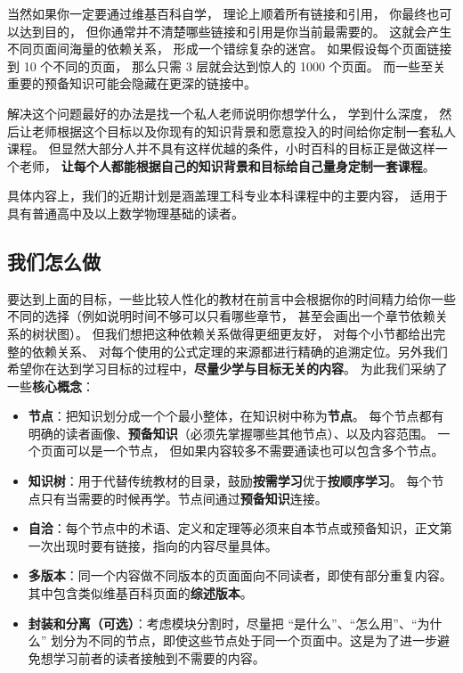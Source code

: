 当然如果你一定要通过维基百科自学， 理论上顺着所有链接和引用， 你最终也可以达到目的， 但你通常并不清楚哪些链接和引用是你当前最需要的。 这就会产生不同页面间海量的依赖关系， 形成一个错综复杂的迷宫。 如果假设每个页面链接到 10 个不同的页面， 那么只需 3 层就会达到惊人的 1000 个页面。 而一些至关重要的预备知识可能会隐藏在更深的链接中。

解决这个问题最好的办法是找一个私人老师说明你想学什么， 学到什么深度， 然后让老师根据这个目标以及你现有的知识背景和愿意投入的时间给你定制一套私人课程。 但显然大部分人并不具有这样优越的条件，小时百科的目标正是做这样一个老师， \textbf{让每个人都能根据自己的知识背景和目标给自己量身定制一套课程}。

具体内容上，我们的近期计划是涵盖理工科专业本科课程中的主要内容， 适用于具有普通高中及以上数学物理基础的读者。

\subsection{我们怎么做}
要达到上面的目标，一些比较人性化的教材在前言中会根据你的时间精力给你一些不同的选择（例如说明时间不够可以只看哪些章节， 甚至会画出一个章节依赖关系的树状图）。 但我们想把这种依赖关系做得更细更友好， 对每个小节都给出完整的依赖关系、 对每个使用的公式定理的来源都进行精确的追溯定位。另外我们希望你在达到学习目标的过程中，\textbf{尽量少学与目标无关的内容}。 为此我们采纳了一些\textbf{核心概念}：
\begin{itemize}
\item \textbf{节点}：把知识划分成一个个最小整体，在知识树中称为\textbf{节点}。 每个节点都有明确的读者画像、\textbf{预备知识}（必须先掌握哪些其他节点）、以及内容范围。 一个页面可以是一个节点， 但如果内容较多不需要通读也可以包含多个节点。
\item \textbf{知识树}：用于代替传统教材的目录，鼓励\textbf{按需学习}优于\textbf{按顺序学习}。 每个节点只有当需要的时候再学。节点间通过\textbf{预备知识}连接。
\item \textbf{自洽}：每个节点中的术语、定义和定理等必须来自本节点或预备知识，正文第一次出现时要有链接，指向的内容尽量具体。
\item \textbf{多版本}：同一个内容做不同版本的页面面向不同读者，即使有部分重复内容。其中包含类似维基百科页面的\textbf{综述版本}。
\item \textbf{封装和分离（可选）}：考虑模块分割时，尽量把 “是什么”、“怎么用”、“为什么” 划分为不同的节点，即使这些节点处于同一个页面中。这是为了进一步避免想学习前者的读者接触到不需要的内容。
\end{itemize}

